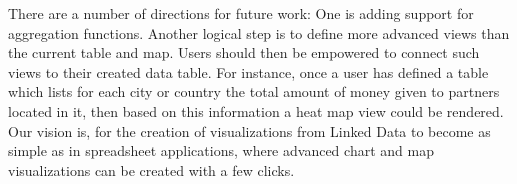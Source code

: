 There are a number of directions for future work: One is adding support for aggregation
functions. Another logical step is to define more advanced views than
the current table and map.
Users should then be empowered to connect such views to their created data
table. For instance, once a user has defined a table which lists for each city
or country the total amount of money given to partners
located in it, then based on this information a heat map view could be rendered.
Our vision is, for the creation of visualizations from Linked
Data to become as simple as in spreadsheet applications,
where advanced chart and map visualizations can be created with a few clicks.




 



%
%

%


